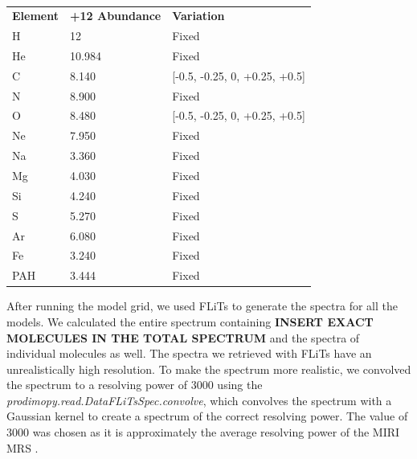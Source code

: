 \documentclass[twoside, single, authoryear, semicolon]{lion-msc}
\newcommand{\4}{$_4$}
\newcommand{\3}{$_3$}
\newcommand{\2}{$_2$}
\begin{document}
\begin{table}[!h]
\centering
\begin{tabular}{@{}lll@{}}
                                  &                             &                            \\ \hline\midrule
\textbf{Element} & \textbf{+12 Abundance} & \textbf{Variation}            \\ \midrule
H                & 12                     & Fixed                         \\
He               & 10.984                 & Fixed                         \\
C                & 8.140                  & {[}-0.5, -0.25, 0, +0.25, +0.5{]} \\
N                & 8.900                  & Fixed                         \\
O                & 8.480                  & {[}-0.5, -0.25, 0, +0.25, +0.5{]} \\
Ne               & 7.950                  & Fixed                         \\
Na               & 3.360                  & Fixed                         \\
Mg               & 4.030                  & Fixed                         \\
Si               & 4.240                  & Fixed                         \\
S                & 5.270                  & Fixed                         \\
Ar               & 6.080                  & Fixed                         \\
Fe               & 3.240                  & Fixed                         \\
PAH              & 3.444                  & Fixed                         \\ \bottomrule
\end{tabular}
\caption{}
\label{tab:abundances}
\end{table}



After running the model grid, we used FLiTs to generate the spectra for all the models. We calculated the entire spectrum containing  \textbf{INSERT EXACT MOLECULES IN THE TOTAL SPECTRUM} and the spectra of individual molecules as well. The spectra we retrieved with FLiTs have an unrealistically high resolution. To make the spectrum more realistic, we convolved the spectrum to a resolving power of 3000 using the \textit{prodimopy.read.DataFLiTsSpec.convolve}\citep{SOURCE}, which convolves the spectrum with a Gaussian kernel to create a spectrum of the correct resolving power. The value of 3000 was chosen as it is approximately the average resolving power of the MIRI MRS \citep{SOURCE}. 
\end{document}
